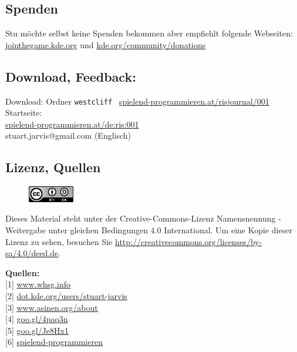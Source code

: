 \subsection*{Spenden}
Stu möchte selbst keine Spenden bekommen aber empfiehlt folgende Webseiten:
\href{http://jointhegame.kde.org}{jointhegame.kde.org} und \href{http://www.kde.org/community/donations/index.php}{kde.org/community/donations}

\subsection*{Download, Feedback:}
\footnotesize{
Download: Ordner \texttt{westcliff} \Mundus\ \href{http://spielend-programmieren.at/risjournal/001}{spielend-programmieren.at/risjournal/001}\\
Startseite:\\
\href{http://spielend-programmieren.at/de:ris:001}{spielend-programmieren.at/de:ris:001}\\ 
\Letter\: stuart.jarvis@gmail.com (Englisch)\\}
\normalsize
 
\subsection*{Lizenz, Quellen}
\begin{figure}
\includegraphics[width=2cm]{ccbysa88x31.png} \\ 
\end{figure}
Dieses Material steht unter der Creative-Commons-Lizenz Namensnennung - Weitergabe unter gleichen Bedingungen 4.0 International. Um eine Kopie dieser Lizenz zu sehen, besuchen Sie \url{http://creativecommons.org/licenses/by-sa/4.0/deed.de}.

\textbf{Quellen:} \\
{[}1{]} \href{http://www.whsg.info}{www.whsg.info} \\
{[}2{]} \href{http://dot.kde.org/users/stuart-jarvis}{dot.kde.org/users/stuart-jarvis} \\
{[}3{]} \href{http://www.asinen.org/about/}{www.asinen.org/about} \\
{[}4{]} \href{http://goo.gl/4paq3n}{goo.gl/4paq3n} \\
{[}5{]} \href{http://goo.gl/Je8Hx1}{goo.gl/Je8Hx1} \\
{[}6{]} \href{http://spielend-programmieren.at}{spielend-programmieren}


